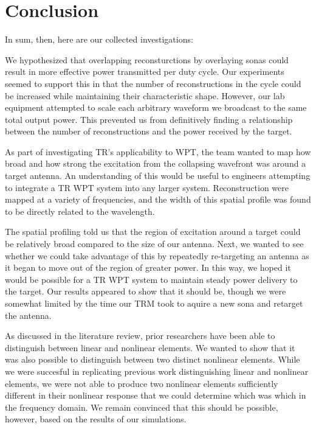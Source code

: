 \chapter{Conclusion}

\label{ch:conclusion}

In sum, then, here are our collected investigations:

We hypothesized that overlapping reconsturctions by overlaying sonas could result in more effective power transmitted per duty cycle. Our experiments seemed to support this in that the number of reconstructions in the cycle could be increased while maintaining their characteristic shape. However, our lab equipment attempted to scale each arbitrary waveform we broadcast to the same total output power. This prevented us from definitively finding a relationship between the number of reconstructions and the power received by the target.

As part of investigating TR's applicability to WPT, the team wanted to map how broad and how strong the excitation from the collapsing wavefront was around a target antenna. An understanding of this would be useful to engineers attempting to integrate a TR WPT system into any larger system. Reconstruction were mapped at a variety of frequencies, and the width of this spatial profile was found to be directly related to the wavelength.

The spatial profiling told us that the region of excitation around a target could be relatively broad compared to the size of our antenna. Next, we wanted to see whether we could take advantage of this by repeatedly re-targeting an antenna as it began to move out of the region of greater power. In this way, we hoped it would be possible for a TR WPT system to maintain steady power delivery to the target. Our results appeared to show that it should be, though we were somewhat limited by the time our TRM took to aquire a new sona and retarget the antenna.

As discussed in the literature review, prior researchers have been able to distinguish between linear and nonlinear elements. We wanted to show that it was also possible to distinguish between two distinct nonlinear elements. While we were succesful in replicating previous work distinguishing linear and nonlinear elements, we were not able to produce two nonlinear elements sufficiently different in their nonlinear response that we could determine which was which in the frequency domain. We remain convinced that this should be possible, however, based on the results of our simulations.


